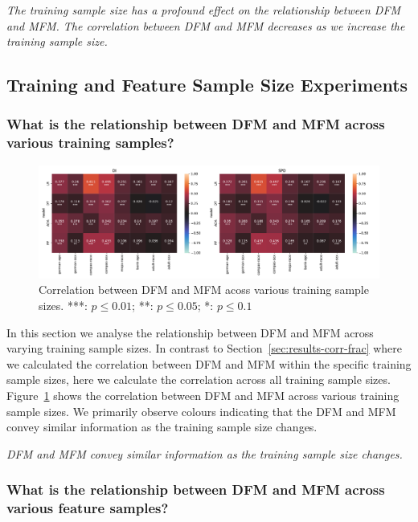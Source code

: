 \documentclass{article}
\newcommand{\highlight}[1]{\begin{framed}%
  \noindent\emph{#1}
\end{framed}}
\begin{document}
\highlight{The training sample size has a profound effect on the
relationship between DFM and MFM. The correlation between DFM and MFM
decreases as we increase the training sample size.}

\subsection{Training and Feature Sample Size
  Experiments}\label{sec:results-training-feature-sets}
\subsubsection{What is the relationship between DFM and MFM across
  various training samples?}\label{sec:results-training-sets}

\begin{figure}
  \centering
  \includegraphics[width=0.95\linewidth]{heatmap--corr--frac.pdf}
  \caption{Correlation between DFM and MFM acoss various training
  sample sizes. ***: $p\le0.01$; **: $p\le0.05$; *: $p\le0.1$}
  \label{fig:heatmap--corr--frac}
\end{figure}

In this section we analyse the relationship between DFM and MFM across
varying training sample sizes. In contrast to
Section \ref{sec:results-corr-frac} where we calculated the
correlation between DFM and MFM within the specific training sample
sizes, here we calculate the correlation across all training sample
sizes. Figure \ref{fig:heatmap--corr--frac} shows the correlation
between DFM and MFM across various training sample sizes. We primarily
observe colours indicating that the DFM and MFM convey similar
information as the training sample size changes.

\highlight{DFM and MFM convey similar information as the training
sample size changes.}

\subsubsection{What is the relationship between DFM and MFM across various feature samples?}\label{sec:results-feature-sets}
\end{document}
